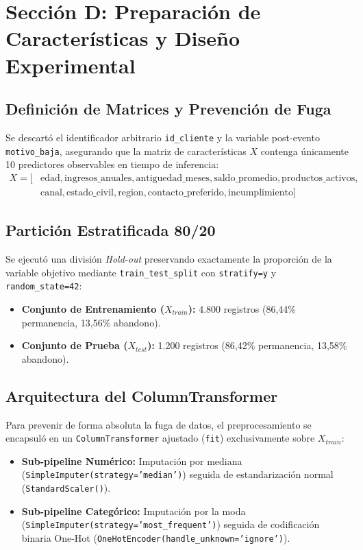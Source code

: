 \documentclass[12pt,a4paper]{article}
\begin{document}
\section{Sección D: Preparación de Características y Diseño Experimental}

\subsection{Definición de Matrices y Prevención de Fuga}
Se descartó el identificador arbitrario \texttt{id\_cliente} y la variable post-evento \texttt{motivo\_baja}, asegurando que la matriz de características $X$ contenga únicamente 10 predictores observables en tiempo de inferencia:
\begin{align}
    X = [ & \text{edad}, \text{ingresos\_anuales}, \text{antiguedad\_meses}, \text{saldo\_promedio}, \text{productos\_activos}, \nonumber \\
          & \text{canal}, \text{estado\_civil}, \text{region}, \text{contacto\_preferido}, \text{incumplimiento} ]
\end{align}

\subsection{Partición Estratificada 80/20}
Se ejecutó una división \textit{Hold-out} preservando exactamente la proporción de la variable objetivo mediante \texttt{train\_test\_split} con \texttt{stratify=y} y \texttt{random\_state=42}:
\begin{itemize}[noitemsep]
    \item \textbf{Conjunto de Entrenamiento ($X_{train}$):} 4.800 registros (86,44\% permanencia, 13,56\% abandono).
    \item \textbf{Conjunto de Prueba ($X_{test}$):} 1.200 registros (86,42\% permanencia, 13,58\% abandono).
\end{itemize}

\subsection{Arquitectura del ColumnTransformer}
Para prevenir de forma absoluta la fuga de datos, el preprocesamiento se encapsuló en un \texttt{ColumnTransformer} ajustado (\texttt{fit}) exclusivamente sobre $X_{train}$:
\begin{itemize}
    \item \textbf{Sub-pipeline Numérico:} Imputación por mediana (\texttt{SimpleImputer(strategy='median')}) seguida de estandarización normal (\texttt{StandardScaler()}).
    \item \textbf{Sub-pipeline Categórico:} Imputación por la moda (\texttt{SimpleImputer(strategy='most\_frequent')}) seguida de codificación binaria One-Hot (\texttt{OneHotEncoder(handle\_unknown='ignore')}).
\end{itemize}
\end{document}
